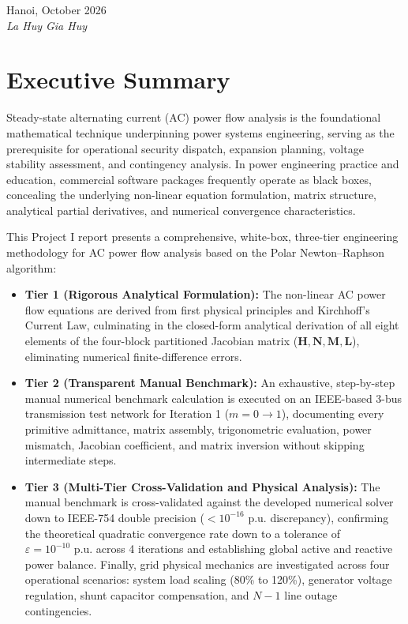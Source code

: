 \documentclass[12pt,a4paper,oneside]{report}
\begin{document}
\vspace{35pt}
\begin{flushright}
    Hanoi, October 2026\\
    \textit{La Huy Gia Huy}
\end{flushright}

\clearpage

\chapter*{Executive Summary}

Steady-state alternating current (AC) power flow analysis is the foundational mathematical technique underpinning power systems engineering, serving as the prerequisite for operational security dispatch, expansion planning, voltage stability assessment, and contingency analysis. In power engineering practice and education, commercial software packages frequently operate as black boxes, concealing the underlying non-linear equation formulation, matrix structure, analytical partial derivatives, and numerical convergence characteristics.

This Project I report presents a comprehensive, white-box, three-tier engineering methodology for AC power flow analysis based on the Polar Newton--Raphson algorithm:
\begin{itemize}
    \item \textbf{Tier 1 (Rigorous Analytical Formulation):} The non-linear AC power flow equations are derived from first physical principles and Kirchhoff's Current Law, culminating in the closed-form analytical derivation of all eight elements of the four-block partitioned Jacobian matrix ($\mathbf{H}, \mathbf{N}, \mathbf{M}, \mathbf{L}$), eliminating numerical finite-difference errors.
    \item \textbf{Tier 2 (Transparent Manual Benchmark):} An exhaustive, step-by-step manual numerical benchmark calculation is executed on an IEEE-based 3-bus transmission test network for Iteration 1 ($m = 0 \to 1$), documenting every primitive admittance, matrix assembly, trigonometric evaluation, power mismatch, Jacobian coefficient, and matrix inversion without skipping intermediate steps.
    \item \textbf{Tier 3 (Multi-Tier Cross-Validation and Physical Analysis):} The manual benchmark is cross-validated against the developed numerical solver down to IEEE-754 double precision ($< 10^{-16}\text{ p.u.}$ discrepancy), confirming the theoretical quadratic convergence rate down to a tolerance of $\varepsilon = 10^{-10}\text{ p.u.}$ across 4 iterations and establishing global active and reactive power balance. Finally, grid physical mechanics are investigated across four operational scenarios: system load scaling (80\% to 120\%), generator voltage regulation, shunt capacitor compensation, and $N-1$ line outage contingencies.
\end{itemize}
\end{document}
